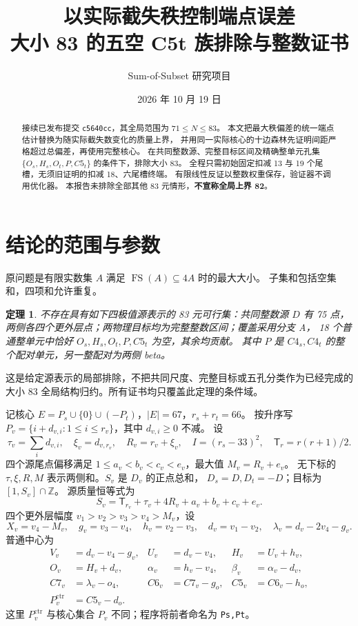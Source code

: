 \documentclass[11pt,a4paper]{article}
\title{以实际截失秩控制端点误差\\\large 大小 83 的五空 C5t 族排除与整数证书}
\author{Sum-of-Subset 研究项目}
\date{2026 年 10 月 19 日}
\newtheorem{theorem}{定理}[section]
\newcommand{\Z}{\mathbb Z}
\newcommand{\T}{\mathsf T}
\begin{document}
\maketitle
\begin{abstract}
接续已发布提交 \texttt{c5640cc}，其全局范围为 $71\le N\le83$。
本文把最大秩偏差的统一端点估计替换为随实际截失数变化的质量上界，
并用同一实际核心的十边森林先证明间距严格超过总偏差，再使用完整核心。
在共同整数源、完整目标区间及精确整单元孔集
$\{O_s,H_s,O_t,P,C5_t\}$ 的条件下，排除大小 83。
全程只需初始固定扣减 13 与 19 个尾槽，无须旧证明的扣减 18、六尾槽终端。
有限线性反证以整数权重保存，验证器不调用优化器。
本报告未排除全部其他 83 元情形，\textbf{不宣称全局上界 82}。
\end{abstract}

\section{结论的范围与参数}
原问题是有限实数集 $A$ 满足 $\operatorname{FS}(A)\subseteq4A$ 时的最大大小。
子集和包括空集和，四项和允许重复。
\begin{theorem}\label{thm:local}
不存在具有如下四极值源表示的 83 元可行集：共同整数源 $D$ 有 75 点，
两侧各四个更外层点；两物理目标均为完整整数区间；覆盖采用分支 A，
18 个普通整单元中恰好 $O_s,H_s,O_t,P,C5_t$ 为空，其余均贡献。
其中 $P$ 是 $C4_s,C4_t$ 的整个配对单元，另一整配对为两侧 beta。
\end{theorem}
这是给定源表示的局部排除，不把共同尺度、完整目标或五孔分类作为已经完成的
大小 83 全局结构归约。所有证书均只覆盖此定理的条件域。

记核心
$E=P_s\cup\{0\}\cup(-P_t)$，$|E|=67$，$r_s+r_t=66$。
按升序写 $P_v=\{i+d_{v,i}:1\le i\le r_v\}$，其中 $d_{v,i}\ge0$ 不减。
设
\[
 \tau_v=\sum_i d_{v,i},\quad\xi_v=d_{v,r_v},\quad R_v=r_v+\xi_v,
 \quad I=(r_s-33)^2,\quad \T_r=r(r+1)/2.
\]
四个源尾点偏移满足 $1\le a_v<b_v<c_v<e_v$，最大值 $M_v=R_v+e_v$。
无下标的 $\tau,\xi,R,M$ 表示两侧和。$S_v$ 是 $D_v$ 的正点总和，
$D_s=D,D_t=-D$；目标为 $[1,S_v]\cap\Z$。
源质量恒等式为
\[
 S_v=\T_{r_v}+\tau_v+4R_v+a_v+b_v+c_v+e_v.
\]
四个更外层幅度 $v_1>v_2>v_3>v_4>M_v$，设
\[
 X_v=v_4-M_v,\quad g_v=v_3-v_4,\quad h_v=v_2-v_3,
 \quad d_v=v_1-v_2,\quad\lambda_v=d_v-2v_4-g_v.
\]
普通中心为
\begin{align*}
 V_v&=d_v-v_4-g_v,& U_v&=d_v-v_4,&H_v&=U_v+h_v,\\
 O_v&=H_v+d_v,&\alpha_v&=h_v-v_4,&\beta_v&=\alpha_v-d_v,\\
 C7_v&=\lambda_v-o_4,&C6_v&=C7_v-g_o,&C5_v&=C6_v-h_o,\\
 P_v^{\mathrm{ctr}}&=C5_v-d_o.&&&&
\end{align*}
这里 $P_v^{\mathrm{ctr}}$ 与核心集合 $P_v$ 不同；程序将前者命名为 \texttt{Ps,Pt}。
\end{document}
